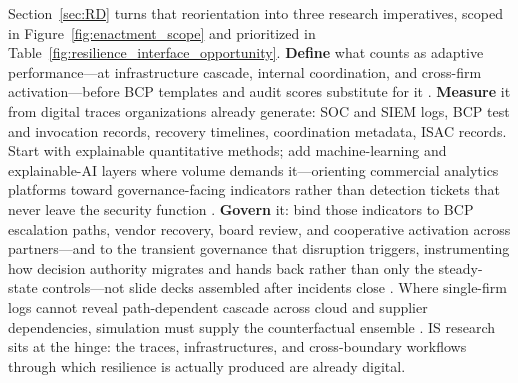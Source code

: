 Section~\ref{sec:RD} turns that reorientation into three research imperatives, scoped in Figure~\ref{fig:enactment_scope} and prioritized in Table~\ref{fig:resilience_interface_opportunity}. \textbf{Define} what counts as adaptive performance---at infrastructure cascade, internal coordination, and cross-firm activation---before BCP templates and audit scores substitute for it \autocite{hillmann2021organizational}. \textbf{Measure} it from digital traces organizations already generate: SOC and SIEM logs, BCP test and invocation records, recovery timelines, coordination metadata, ISAC records. Start with explainable quantitative methods; add machine-learning and explainable-AI layers where volume demands it---orienting commercial analytics platforms toward governance-facing indicators rather than detection tickets that never leave the security function \autocite{francis2014metric,gillard2023efficient}. \textbf{Govern} it: bind those indicators to BCP escalation paths, vendor recovery, board review, and cooperative activation across partners---and to the transient governance that disruption triggers, instrumenting how decision authority migrates and hands back rather than only the steady-state controls---not slide decks assembled after incidents close \autocite{boin2013resilient,skopik2016problem,ecb2018tiber}. Where single-firm logs cannot reveal path-dependent cascade across cloud and supplier dependencies, simulation must supply the counterfactual ensemble \autocite{dawson2011agentbased,kwakkel2016comparing}. IS research sits at the hinge: the traces, infrastructures, and cross-boundary workflows through which resilience is actually produced are already digital.

